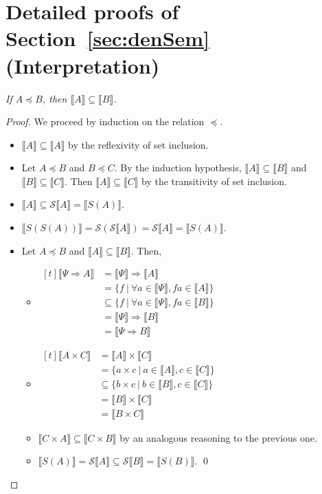 \documentclass[preprint]{elsarticle}
\newcommand\recap[3]{\noindent {\bf #1 \ref{#2}.} \emph{#3}}
\newcommand\gB{\ensuremath{\Psi}}
\newcommand\gen{\mathcal S} \newcommand\den[1]{\llbracket #1 \rrbracket}
\begin{document}
\section{Detailed proofs of Section~\ref{sec:denSem} (Interpretation)}\label{ap:denSem}
\recap{Lemma}{lem:inc}{If $A\preceq B$, then $\den A\subseteq\den B$.}
\begin{proof}
  We proceed by induction on the relation $\preceq$.
  \begin{itemize}
  \item $\den{A} \subseteq \den{A}$ by the reflexivity of set inclusion.
  \item Let $A\preceq B$ and $B\preceq C$. By the induction hypothesis, $\den A\subseteq \den B$ and $\den B\subseteq \den C$. Then $\den A\subseteq \den C$ by the transitivity of set inclusion.
  \item $\den A\subseteq\gen\den A=\den{S(A)}$.
  \item $\den{S(S(A))}=\gen(\gen\den A)=\gen\den A=\den{S(A)}$.
  \item Let $A\preceq B$ and $\den A\subseteq \den B$. Then,
    \begin{itemize}
    \item $\begin{aligned}[t] \den{\gB\Rightarrow A}
        &=\den{\gB}\Rightarrow\den A\\
        &=\{f~|~\forall a\in\den{\gB}, fa\in\den A\}\\
        &\subseteq\{f~|~\forall a\in\den{\gB},fa\in\den B\}\\
        &=\den{\gB}\Rightarrow\den B\\
        &=\den{\gB\Rightarrow B}
      \end{aligned}$
    \item $\begin{aligned}[t] \den{A\times C}
        &=\den A\times\den C\\
        &=\{a\times c~|~a\in\den A,c\in\den C\}\\
        &\subseteq\{b\times c~|~b\in\den B,c\in\den C\}\\
        &=\den B\times\den C\\
        &=\den{B\times C}
      \end{aligned}$
    \item $\den{C\times A}\subseteq\den{C\times B}$ by an analogous reasoning
      to the previous one.
    \item $\den{S(A)}=\gen\den A\subseteq\gen\den B=\den{S(B)}$.
      \qed
    \end{itemize}
  \end{itemize}
\end{proof}
\end{document}
